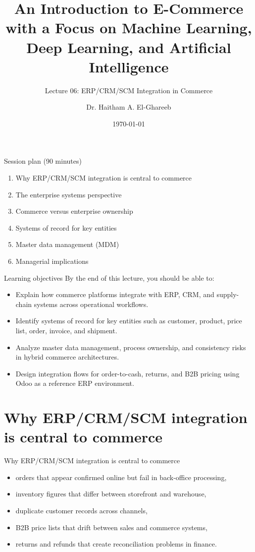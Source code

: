 \documentclass[aspectratio=169]{beamer}
\title[Lecture 06]{An Introduction to E-Commerce\\\small with a Focus on Machine Learning, Deep Learning, and Artificial Intelligence}
\subtitle{Lecture 06: ERP/CRM/SCM Integration in Commerce}
\author{Dr. Haitham A. El-Ghareeb}
\institute{Faculty of Computers and Information Sciences \\ Mansoura University \\ Egypt}
\date{\today}
\begin{document}
\begin{frame}
  \titlepage
\end{frame}

\begin{frame}{Session plan (90 minutes)}
  \begin{enumerate}
    \item Why ERP/CRM/SCM integration is central to commerce
    \item The enterprise systems perspective
    \item Commerce versus enterprise ownership
    \item Systems of record for key entities
    \item Master data management (MDM)
    \item Managerial implications
  \end{enumerate}
\end{frame}

\begin{frame}{Learning objectives}
  By the end of this lecture, you should be able to:
  \begin{itemize}
    \item Explain how commerce platforms integrate with ERP, CRM, and supply-chain systems across operational workflows.
    \item Identify systems of record for key entities such as customer, product, price list, order, invoice, and shipment.
    \item Analyze master data management, process ownership, and consistency risks in hybrid commerce architectures.
    \item Design integration flows for order-to-cash, returns, and B2B pricing using Odoo as a reference ERP environment.
  \end{itemize}
\end{frame}

\section{Why ERP/CRM/SCM integration is central to commerce}

\begin{frame}{Why ERP/CRM/SCM integration is central to commerce}
  \begin{itemize}
    \item orders that appear confirmed online but fail in back-office processing,
    \item inventory figures that differ between storefront and warehouse,
    \item duplicate customer records across channels,
    \item B2B price lists that drift between sales and commerce systems,
    \item returns and refunds that create reconciliation problems in finance.
  \end{itemize}
\end{frame}
\end{document}
